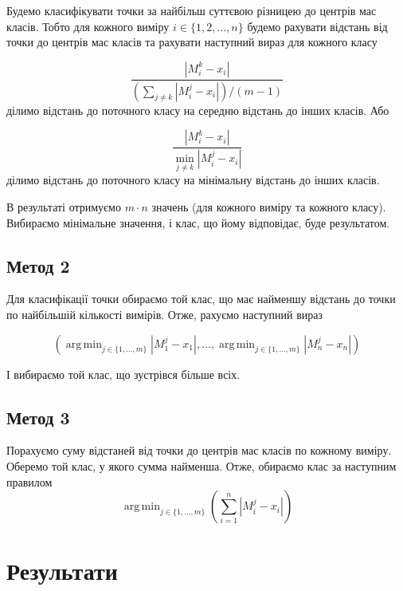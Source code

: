 \documentclass[a4paper,12pt]{article}
\DeclareMathOperator*{\argmin}{arg\,min}
\begin{document}
Будемо класифікувати точки за найбільш суттєвою різницею до центрів мас класів. Тобто для кожного виміру $i \in \{1,2,\ldots, n \}$ будемо рахувати відстань від точки до центрів мас класів та рахувати наступний вираз для кожного класу

\begin{equation}
	\frac{|M^k_i -x_i|}{ \left(\sum_{j \ne k} |M^j_i - x_i|\right)/(m-1)}
\end{equation}
ділимо відстань до поточного класу на середню відстань до інших класів. Або

\begin{equation} \label{eq_min}
	\frac{|M^k_i -x_i|}{\min_{j \ne k} |M^j_i - x_i|}
\end{equation}
ділимо відстань до поточного класу на мінімальну відстань до інших класів.

В результаті отримуємо $m \cdot n$ значень (для кожного виміру та кожного класу). Вибираємо мінімальне значення, і клас, що йому відповідає, буде результатом.

\subsection{Метод 2}

Для класифікації точки обираємо той клас, що має найменшу відстань до точки по найбільшій кількості вимірів. Отже, рахуємо наступний вираз

\begin{equation}
	\left( \argmin_{j \in\{1,\ldots, m\}}|M^j_1 - x_1|, \ldots, \argmin_{j \in \{1,\ldots, m\}}|M^j_n - x_n| \right)
\end{equation}

І вибираємо той клас, що зустрівся більше всіх.

\subsection{Метод 3}

Порахуємо суму відстаней від точки до центрів мас класів по кожному виміру. Оберемо той клас, у якого сумма найменша. Отже, обираємо клас за наступним правилом
\begin{equation}
	\argmin_{j \in \{1,\ldots, m\}} \left( \sum_{i=1}^n |M_i^j - x_i| \right)
\end{equation}


\section{Результати}
\end{document}
